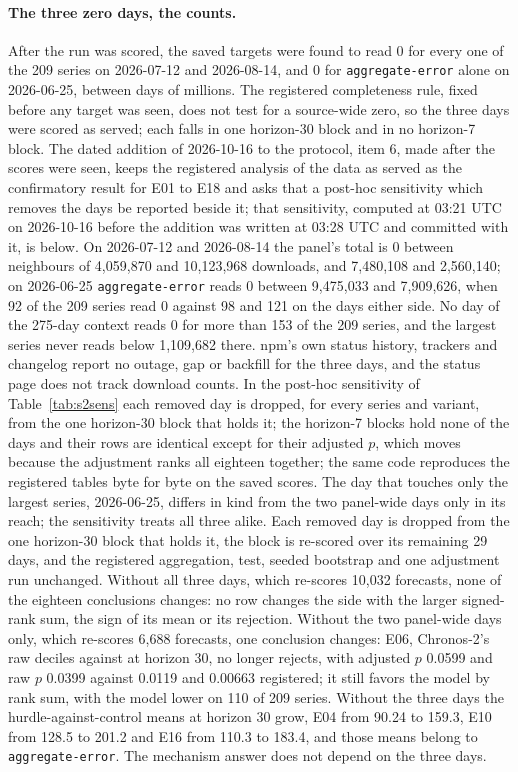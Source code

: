 \paragraph{The three zero days, the counts.} After the run was scored, the saved targets were found to
read 0 for every one of the 209 series on 2026-07-12 and 2026-08-14, and 0 for \texttt{aggregate-error}
alone on 2026-06-25, between days of millions. The registered completeness rule, fixed before any target was
seen, does not test for a source-wide zero, so the three days were scored as served; each falls in one
horizon-30 block and in no horizon-7 block. The dated addition of 2026-10-16 to the protocol, item 6, made
after the scores were seen, keeps the registered analysis of the data as served as the confirmatory result
for E01 to E18 and asks that a post-hoc sensitivity which removes the days be reported beside it; that
sensitivity, computed at 03:21 UTC on 2026-10-16 before the addition was written at 03:28 UTC and committed
with it, is below. On 2026-07-12 and 2026-08-14 the panel's total is 0
between neighbours of 4,059,870 and 10,123,968 downloads, and 7,480,108 and 2,560,140; on 2026-06-25
\texttt{aggregate-error} reads 0 between 9,475,033 and 7,909,626, when 92 of the 209 series read 0 against
98 and 121 on the days either side. No day of the 275-day context reads 0 for more than 153 of the 209
series, and the largest series never reads below 1,109,682 there. npm's own status history, trackers and
changelog report no outage, gap or backfill for the three days, and the status page does not track download
counts. In the post-hoc sensitivity of Table~\ref{tab:s2sens} each removed day is dropped, for every series
and variant, from the one horizon-30 block that holds it; the horizon-7 blocks hold none of the days and
their rows are identical except for their adjusted $p$, which moves because the adjustment ranks all
eighteen together; the same code reproduces the registered tables byte for byte on the saved scores. The day
that touches only the largest series, 2026-06-25, differs in kind from the two panel-wide days only in its
reach; the sensitivity treats all three alike. Each removed day is dropped from the one horizon-30 block that
holds it, the block is re-scored over its remaining 29 days, and the registered aggregation, test, seeded
bootstrap and one adjustment run unchanged. Without all three days, which re-scores 10,032 forecasts, none
of the eighteen conclusions changes: no row changes the side with the larger signed-rank sum, the sign of
its mean or its rejection. Without the two panel-wide days only, which re-scores 6,688 forecasts, one
conclusion changes: E06, Chronos-2's raw deciles against \lm{} at horizon 30, no longer rejects, with
adjusted $p$ 0.0599 and raw $p$ 0.0399 against 0.0119 and 0.00663 registered; it still favors the model by
rank sum, with the model lower on 110 of 209 series. Without the three days the hurdle-against-control means
at horizon 30 grow, E04 from 90.24 to 159.3, E10 from 128.5 to 201.2 and E16 from 110.3 to 183.4, and those
means belong to \texttt{aggregate-error}. The mechanism answer does not depend on the three days.

